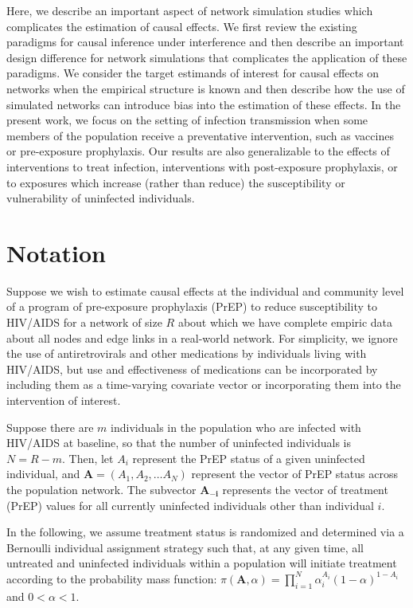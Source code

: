 \documentclass{article}
\theoremstyle{definition}
\begin{document}
Here, we describe an important aspect of network simulation studies which complicates the estimation of causal effects. We first review the existing paradigms for causal inference under interference and then describe an important design difference for network simulations that complicates the application of these paradigms. We consider the target estimands of interest for causal effects on networks when the empirical structure is known and then describe how the use of simulated networks can introduce bias into the estimation of these effects. In the present work, we focus on the setting of infection transmission when some members of the population receive a preventative intervention, such as vaccines or pre-exposure prophylaxis. Our results are also generalizable to the effects of interventions to treat infection, interventions with post-exposure prophylaxis, or to exposures which increase (rather than reduce) the susceptibility or vulnerability of uninfected individuals. 

\section{Notation}
Suppose we wish to estimate causal effects at the individual and community level of a program of pre-exposure prophylaxis (PrEP) to reduce susceptibility to HIV/AIDS for a network of size $R$ about which we have complete empiric data about all nodes and edge links in a real-world network. For simplicity, we ignore the use of antiretrovirals and other medications by individuals living with HIV/AIDS, but use and effectiveness of medications can be incorporated by including them as a time-varying covariate vector or incorporating them into the intervention of interest.

Suppose there are $m$ individuals in the population who are infected with HIV/AIDS at baseline, so that the number of uninfected individuals is $N = R-m$. Then, let $A_{i}$ represent the PrEP status of a given uninfected individual, and $\mathbf{A} = (A_{1}, A_{2}, \ldots A_{N})$ represent the vector of PrEP status across the population network. The subvector $\mathbf{A_{-i}}$ represents the vector of treatment (PrEP) values for all currently uninfected individuals other than individual $i$.

In the following, we assume treatment status is randomized and determined via a Bernoulli individual assignment strategy such that, at any given time, all untreated and uninfected individuals within a population will initiate treatment according to the probability mass function: $\pi(\mathbf{A}, \alpha) = \prod_{i=1}^{N}{\alpha_{i}^{A_{i}}(1-\alpha)^{1-A_{i}}}$ and $0 < \alpha < 1$. 
\end{document}
